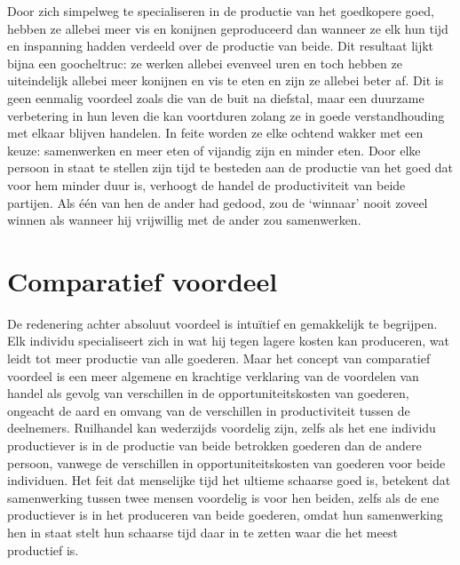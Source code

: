 \documentclass[
  a5paper,
  smalldemyvopaper,11pt,twoside,onecolumn,openright,extrafontsizes,
hidelinks]{memoir}
\begin{document}
Door zich simpelweg te specialiseren in de productie van het goedkopere
goed, hebben ze allebei meer vis en konijnen geproduceerd dan wanneer ze
elk hun tijd en inspanning hadden verdeeld over de productie van beide.
Dit resultaat lijkt bijna een goocheltruc: ze werken allebei evenveel
uren en toch hebben ze uiteindelijk allebei meer konijnen en vis te eten
en zijn ze allebei beter af. Dit is geen eenmalig voordeel zoals die van
de buit na diefstal, maar een duurzame verbetering in hun leven die kan
voortduren zolang ze in goede verstandhouding met elkaar blijven
handelen. In feite worden ze elke ochtend wakker met een keuze:
samenwerken en meer eten of vijandig zijn en minder eten. Door elke
persoon in staat te stellen zijn tijd te besteden aan de productie van
het goed dat voor hem minder duur is, verhoogt de handel de
productiviteit van beide partijen. Als één van hen de ander had gedood,
zou de `winnaar' nooit zoveel winnen als wanneer hij vrijwillig met de
ander zou samenwerken.

\section{Comparatief voordeel}\label{comparatief-voordeel}

De redenering achter absoluut voordeel is intuïtief en gemakkelijk te
begrijpen. Elk individu specialiseert zich in wat hij tegen lagere
kosten kan produceren, wat leidt tot meer productie van alle goederen.
Maar het concept van comparatief voordeel is een meer algemene en
krachtige verklaring van de voordelen van handel als gevolg van
verschillen in de opportuniteitskosten van goederen, ongeacht de aard en
omvang van de verschillen in productiviteit tussen de deelnemers.
Ruilhandel kan wederzijds voordelig zijn, zelfs als het ene individu
productiever is in de productie van beide betrokken goederen dan de
andere persoon, vanwege de verschillen in opportuniteitskosten van
goederen voor beide individuen. Het feit dat menselijke tijd het ultieme
schaarse goed is, betekent dat samenwerking tussen twee mensen voordelig
is voor hen beiden, zelfs als de ene productiever is in het produceren
van beide goederen, omdat hun samenwerking hen in staat stelt hun
schaarse tijd daar in te zetten waar die het meest productief is.
\end{document}
